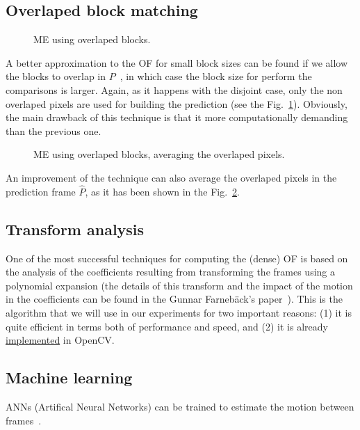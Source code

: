 \subsection{Overlaped block matching}

\begin{figure}
  \centering
  \caption{ME using overlaped blocks.}
  \label{fig:overlaped}
\end{figure}

A better approximation to the OF for small block sizes can be found if
we allow the blocks to overlap in $P$~\cite{orchard1994overlapped}, in
which case the block size for perform the comparisons is
larger. Again, as it happens with the disjoint case, only the non
overlaped pixels are used for building the prediction (see the
Fig.~\ref{fig:overlaped}). Obviously, the main drawback of this
technique is that it more computationally demanding than the previous
one.

\begin{figure}
  \centering
  \caption{ME using overlaped blocks, averaging the overlaped pixels.}
  \label{fig:average}
\end{figure}

An improvement of the technique can also average the overlaped pixels
in the prediction frame $\hat{P}$, as it has been shown in the
Fig.~\ref{fig:average}.

\subsection{Transform analysis}
One of the most successful techniques for computing the (dense) OF is
based on the analysis of the coefficients resulting from transforming
the frames using a polynomial expansion (the details of this transform
and the impact of the motion in the coefficients can be found in the
Gunnar Farneb{\"a}ck's paper~\cite{farneback2003two}). This is the
algorithm that we will use in our experiments for two important
reasons: (1) it is quite efficient in terms both of performance and
speed, and (2) it is already
\href{https://docs.opencv.org/3.4/d4/dee/tutorial_optical_flow.html}{implemented}
in OpenCV.

\subsection{Machine learning}
ANNs (Artifical Neural Networks) can be trained to estimate the
motion between frames~\cite{dosovitskiy2015flownet}.

